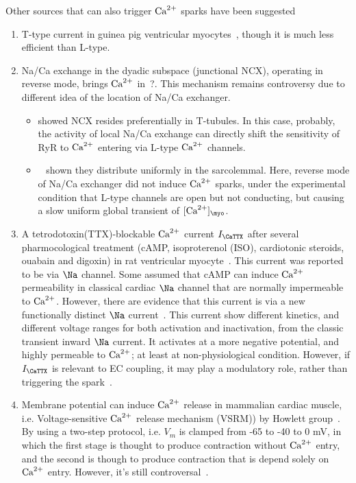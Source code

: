 Other sources that can also trigger ${\text{Ca}^{2+}}$ sparks have been suggested
\begin{enumerate}
\item T-type current in guinea pig ventricular
  myocytes~\citep{sipido1998}, though it is much less efficient than
  L-type.

\item Na/Ca exchange in the dyadic subspace (junctional NCX), 
  operating in reverse mode, brings ${\text{Ca}^{2+}}$ in~\citep{blaustein1999}?.
  This mechanism remains controversy due to different idea of the
  location of Na/Ca exchanger.
  \begin{itemize}
  \item \citep{litwin1998}
    showed NCX resides preferentially in T-tubules. In this case, probably,
    the activity of local Na/Ca exchange can directly shift the
    sensitivity of RyR to ${\text{Ca}^{2+}}$ entering via L-type ${\text{Ca}^{2+}}$
    channels.

  \item ~\citep{lopez-lopez1995} shown they distribute uniformly in the
  sarcolemmal. Here, reverse mode of Na/Ca exchanger did not induce ${\text{Ca}^{2+}}$
  sparks, under the
    experimental condition that L-type channels are open but not conducting, but
    causing a slow uniform global transient of $[\Ca]_\myo$.
  \end{itemize}


\item A tetrodotoxin(TTX)-blockable ${\text{Ca}^{2+}}$ current $I_\CaTTX$ after several
pharmocological
  treatment (cAMP, isoproterenol (ISO), cardiotonic steroids, ouabain and
  digoxin) in rat ventricular myocyte~\citep{santana1998}. This current was
  reported to be via $\Na$ channel. Some assumed that cAMP can induce ${\text{Ca}^{2+}}$
  permeability in classical cardiac $\Na$ channel that are normally impermeable
  to ${\text{Ca}^{2+}}$. However, there are evidence that this current is via a new
  functionally distinct $\Na$ current~\citep{aggarwal1997}. This current show
  different kinetics, and different voltage ranges for both activation and
  inactivation, from the classic transient inward $\Na$ current.
  It activates at a more negative potential, and highly permeable to ${\text{Ca}^{2+}}$; at
  least at non-physiological condition. However, if $I_\CaTTX$ is relevant to EC
  coupling, it may play a modulatory role, rather than triggering the
  spark~\citep{wier1999}.

\item Membrane potential can induce ${\text{Ca}^{2+}}$ release in mammalian cardiac
  muscle, i.e. Voltage-sensitive ${\text{Ca}^{2+}}$ release mechanism (VSRM)) by
  Howlett group~\citep{ferrier1995,hobai1997,howlett1998}.  By using a
  two-step protocol, i.e. $V_m$ is clamped from -65 to -40 to 0 mV, in
  which the first stage is thought to produce contraction without
  ${\text{Ca}^{2+}}$ entry, and the second is though to produce contraction that is
  depend solely on ${\text{Ca}^{2+}}$ entry. However, it's still
  controversal~\citep{wier1999}.
\end{enumerate}

